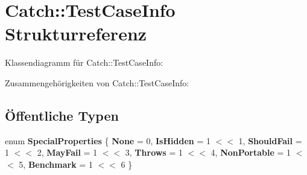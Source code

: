 \hypertarget{structCatch_1_1TestCaseInfo}{}\section{Catch\+:\+:Test\+Case\+Info Strukturreferenz}
\label{structCatch_1_1TestCaseInfo}


Klassendiagramm für Catch\+:\+:Test\+Case\+Info\+:


Zusammengehörigkeiten von Catch\+:\+:Test\+Case\+Info\+:
\subsection*{Öffentliche Typen}
\begin{DoxyCompactItemize}
\item 
\mbox{\label{structCatch_1_1TestCaseInfo_a39b232f74b4a7a6f2183b96759027eac}} 
enum {\bfseries Special\+Properties} \{ \newline
{\bfseries None} = 0, 
{\bfseries Is\+Hidden} = 1 $<$$<$ 1, 
{\bfseries Should\+Fail} = 1 $<$$<$ 2, 
{\bfseries May\+Fail} = 1 $<$$<$ 3, 
\newline
{\bfseries Throws} = 1 $<$$<$ 4, 
{\bfseries Non\+Portable} = 1 $<$$<$ 5, 
{\bfseries Benchmark} = 1 $<$$<$ 6
 \}
\end{DoxyCompactItemize}
